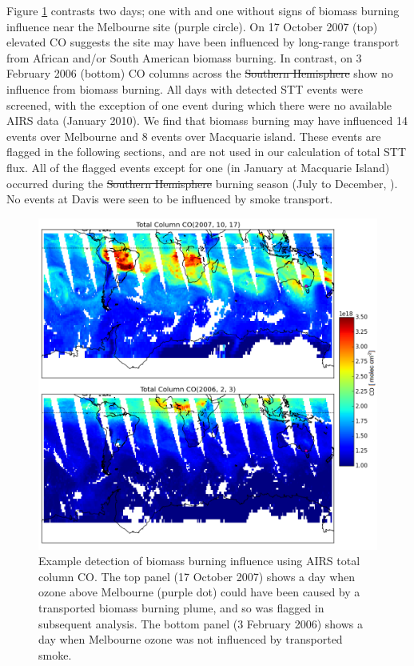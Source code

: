 \documentclass[acp, manuscript]{copernicus} %
\providecommand{\DIFadd}[1]{{\protect\color{blue}\uwave{#1}}} %
\providecommand{\DIFdel}[1]{{\protect\color{red}\sout{#1}}}                      %
\providecommand{\DIFaddbegin}{} %
\providecommand{\DIFaddend}{} %
\providecommand{\DIFdelbegin}{} %
\providecommand{\DIFdelend}{} %
\begin{document}
    Figure \ref{fig:excludedeg} contrasts two days; one with and one without signs of biomass burning influence near the Melbourne site (purple circle).
    On 17 October 2007 (top) elevated CO suggests the site may have been influenced by long-range transport from African and/or South American biomass burning.
    In contrast, on 3 February 2006 (bottom) CO columns across the \DIFdelbegin \DIFdel{Southern Hemisphere }\DIFdelend \DIFaddbegin \DIFadd{SH }\DIFaddend show no influence from biomass burning.
    All days with detected STT events were screened, with the exception of one event during which there were no available AIRS data (January 2010).
    We find that biomass burning may have influenced 14 events over Melbourne and 8 events over Macquarie island.
    These events are flagged in the following sections, and are not used in our calculation of total STT flux.
    All of the flagged events except for one (in January at Macquarie Island) occurred during the \DIFdelbegin \DIFdel{Southern Hemisphere }\DIFdelend \DIFaddbegin \DIFadd{SH }\DIFaddend burning season (July to December, \citet{Edwards2006}). %
    No events at Davis were seen to be influenced by smoke transport.

    \begin{figure}[t]
      \includegraphics[width=12cm]{figures/AIRS_compare.png}
      \caption{ %
	Example detection of biomass burning influence using AIRS total column CO. 
	The top panel (17 October 2007) shows a day when ozone above Melbourne (purple dot) could have been caused by a transported biomass burning plume, and so was flagged in subsequent analysis.
	The bottom panel (3 February 2006) shows a day when Melbourne ozone was not influenced by transported smoke.
	}
      \label{fig:excludedeg}
    \end{figure}
\end{document}
